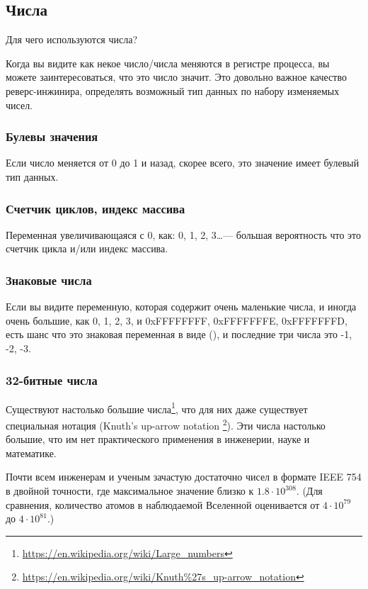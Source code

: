 \subsection{Числа}

Для чего используются числа?

Когда вы видите как некое число/числа меняются в регистре процесса, вы можете заинтересоваться, что это число значит.
Это довольно важное качество реверс-инжинира, определять возможный тип данных по набору изменяемых чисел.

\subsubsection{Булевы значения}

Если число меняется от 0 до 1 и назад, скорее всего, это значение имеет булевый тип данных.

\subsubsection{Счетчик циклов, индекс массива}

Переменная увеличивающаяся с 0, как: 0, 1, 2, 3\dots --- большая вероятность что это счетчик цикла и/или индекс массива.

\subsubsection{Знаковые числа}

Если вы видите переменную, которая содержит очень маленькие числа, и иногда очень большие,
как 0, 1, 2, 3, и 0xFFFFFFFF, 0xFFFFFFFE, 0xFFFFFFFD,
есть шанс что это знаковая переменная в виде  (),
и последние три числа это -1, -2, -3.

\subsubsection{32-битные числа}

Существуют настолько большие числа\footnote{\url{https://en.wikipedia.org/wiki/Large_numbers}},
что для них даже существует специальная нотация (Knuth's up-arrow notation
\footnote{\url{https://en.wikipedia.org/wiki/Knuth\%27s_up-arrow_notation}}).
Эти числа настолько большие, что им нет практического применения в инженерии, науке и математике.

Почти всем инженерам и ученым зачастую достаточно чисел в формате IEEE 754 в двойной точности,
где максимальное значение близко к $1.8 \cdot 10^{308}$.
(Для сравнения, количество атомов в наблюдаемой Вселенной оценивается от $4 \cdot 10^{79}$ до $4 \cdot 10^{81}$.)

